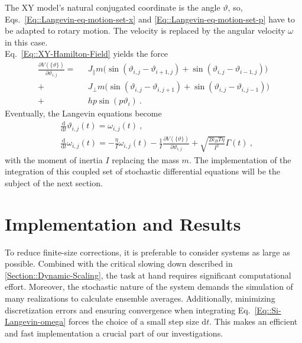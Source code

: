 	The XY model's natural conjugated coordinate is the angle $\vartheta$, so, Eqs.~\eqref{Eq::Langevin-eq-motion-set-x} and \eqref{Eq::Langevin-eq-motion-set-p} have to be adapted to rotary motion. The velocity is replaced by the angular velocity $\omega$ in this case. \\
	
	Eq.~\eqref{Eq::XY-Hamilton-Field} yields the force
	\begin{equation} \label{Eq::Potential-Derivative}
		\begin{split}
			\frac{\partial V(\{\vartheta\})}{\partial \vartheta_{i, j}} = ~~~& J_\parallel m \Big( \sin \left(\vartheta_{i,j} - \vartheta_{i + 1, j} \right) +   \sin \left(\vartheta_{i,j} - \vartheta_{i-1, j} \right) \Big)	 \\
			+ &J_\perp m \Big( \sin \left(\vartheta_{i,j} - \vartheta_{i, j+1} \right) +  \sin \left(\vartheta_{i,j} - \vartheta_{i, j-1} \right) \Big) \\
			+ &h p \sin(p\vartheta_i)~.
		\end{split}
	\end{equation}
	Eventually, the Langevin equations become
	\begin{align}
		&\frac{\text{d}}{\text{d}t} \vartheta_{i,j}(t) =	 \omega_{i,j}(t)~, \label{Eq::Si-Langevin-theta} \\
		&\frac{\text{d}}{\text{d}t} \omega_{i,j}(t) =	- \frac{\eta}{I} \omega_{i,j}(t) - \frac{1}{I}\frac{\partial V(\{\vartheta\})}{\partial \vartheta_{i,j}} + \sqrt{\frac{2 k_B T \eta}{I^2}} \Gamma(t)~, \label{Eq::Si-Langevin-omega}
	\end{align}
	with the moment of inertia $I$ replacing the mass $m$. The implementation of the integration of this coupled set of stochastic differential equations will be the subject of the next section.
	\chapter{Implementation and Results} \label{Chapter::Implementation-Results}
	To reduce finite-size corrections, it is preferable to consider systems as large as possible. Combined with the critical slowing down described in  \autoref{Section::Dynamic-Scaling}, the task at hand requires significant computational effort. Moreover, the stochastic nature of the system demands the simulation of many realizations to calculate ensemble averages. Additionally, minimizing discretization errors and ensuring convergence when integrating Eq.~\eqref{Eq::Si-Langevin-omega} forces the choice of a small step size $\text{d}t$. This makes an efficient and fast implementation a crucial part of our investigations.
